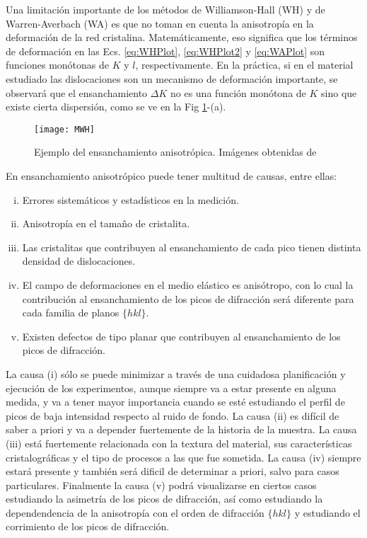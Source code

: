 Una limitación importante de los métodos de Williamson-Hall (WH) y de Warren-Averbach (WA) es que no toman en cuenta la anisotropía en la deformación de la red cristalina. 
Matemáticamente, eso significa que los términos de deformación en las Ecs. \ref{eq:WHPlot}, \ref{eq:WHPlot2} y \ref{eq:WAPlot} son funciones monótonas de $K$ y $l$, respectivamente.
En la práctica, si en el material estudiado las dislocaciones son un mecanismo de deformación importante, se observará que el ensanchamiento $\Delta K$ no es una función monótona de $K$ sino que existe cierta dispersión, como se ve en la Fig \ref{fig:MWH}-(a). 

\begin{figure}[!htb]
  \centering
  \texttt{[image: MWH]}
  \caption{Ejemplo del ensanchamiento anisotrópica. Imágenes obtenidas de \cite{Ungar1999}}
  \label{fig:MWH}
\end{figure}

En ensanchamiento anisotrópico puede tener multitud de causas, entre ellas:
\begin{enumerate}[(i)]
  \item Errores sistemáticos y estadísticos en la medición. 
  \item Anisotropía en el tamaño de cristalita.
  \item Las cristalitas que contribuyen al ensanchamiento de cada pico tienen distinta densidad de dislocaciones.
  \item El campo de deformaciones en el medio elástico es anisótropo, con lo cual la contribución al ensanchamiento de los picos de difracción será diferente para cada familia de planos $\{hkl\}$.
  \item Existen defectos de tipo planar que contribuyen al ensanchamiento de los picos de difracción.
\end{enumerate}

La causa (i) sólo se puede minimizar a través de una cuidadosa planificación y ejecución de los experimentos, aunque siempre va a estar presente en alguna medida, y va a tener mayor importancia cuando se esté estudiando el perfil de picos de baja intensidad respecto al ruido de fondo. 
La causa (ii) es difícil de saber a priori y va a depender fuertemente de la historia de la muestra. 
La causa (iii) está fuertemente relacionada con la textura del material, sus características cristalográficas y el tipo de procesos a las que fue sometida. 
La causa (iv) siempre estará presente y también será dificil de determinar a priori, salvo para casos particulares.
Finalmente la causa (v) podrá visualizarse en ciertos casos estudiando la asimetría de los picos de difracción, así como estudiando la dependendencia de la anisotropía con el orden de difracción $\{hkl\}$ y estudiando el corrimiento de los picos de difracción.

